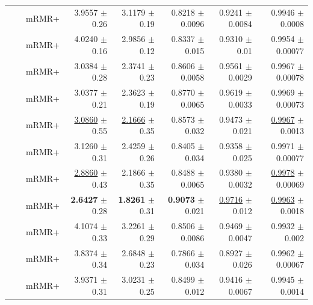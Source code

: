\begin{longtable}{llp{}rrrrr}
 &  & mRMR+ & 3.9557 {\scriptsize $\pm$ 0.26} & 3.1179 {\scriptsize $\pm$ 0.19} & 0.8218 {\scriptsize $\pm$ 0.0096} & 0.9241 {\scriptsize $\pm$ 0.0084} & 0.9946 {\scriptsize $\pm$ 0.0008} \\
 &  & mRMR+ & 4.0240 {\scriptsize $\pm$ 0.16} & 2.9856 {\scriptsize $\pm$ 0.12} & 0.8337 {\scriptsize $\pm$ 0.015} & 0.9310 {\scriptsize $\pm$ 0.01} & 0.9954 {\scriptsize $\pm$ 0.00077} \\
 &  & mRMR+ & 3.0384 {\scriptsize $\pm$ 0.28} & 2.3741 {\scriptsize $\pm$ 0.23} & 0.8606 {\scriptsize $\pm$ 0.0058} & 0.9561 {\scriptsize $\pm$ 0.0029} & 0.9967 {\scriptsize $\pm$ 0.00078} \\
 &  & mRMR+ & 3.0377 {\scriptsize $\pm$ 0.21} & 2.3623 {\scriptsize $\pm$ 0.19} & 0.8770 {\scriptsize $\pm$ 0.0065} & 0.9619 {\scriptsize $\pm$ 0.0033} & 0.9969 {\scriptsize $\pm$ 0.00073} \\
 &  & mRMR+ & \underline{3.0860} {\scriptsize $\pm$ 0.55} & \underline{2.1666} {\scriptsize $\pm$ 0.35} & 0.8573 {\scriptsize $\pm$ 0.032} & 0.9473 {\scriptsize $\pm$ 0.021} & \underline{0.9967} {\scriptsize $\pm$ 0.0013} \\
 &  & mRMR+ & 3.1260 {\scriptsize $\pm$ 0.31} & 2.4259 {\scriptsize $\pm$ 0.26} & 0.8405 {\scriptsize $\pm$ 0.034} & 0.9358 {\scriptsize $\pm$ 0.025} & 0.9971 {\scriptsize $\pm$ 0.00077} \\
 &  & mRMR+ & \underline{2.8860} {\scriptsize $\pm$ 0.43} & 2.1866 {\scriptsize $\pm$ 0.35} & 0.8488 {\scriptsize $\pm$ 0.0065} & 0.9380 {\scriptsize $\pm$ 0.0032} & \underline{0.9978} {\scriptsize $\pm$ 0.00069} \\
 &  & mRMR+ & \textbf{2.6427} {\scriptsize $\pm$ 0.28} & \textbf{1.8261} {\scriptsize $\pm$ 0.31} & \textbf{0.9073} {\scriptsize $\pm$ 0.021} & \underline{0.9716} {\scriptsize $\pm$ 0.012} & \underline{0.9963} {\scriptsize $\pm$ 0.0018} \\
 &  & mRMR+ & 4.1074 {\scriptsize $\pm$ 0.33} & 3.2261 {\scriptsize $\pm$ 0.29} & 0.8506 {\scriptsize $\pm$ 0.0086} & 0.9469 {\scriptsize $\pm$ 0.0047} & 0.9932 {\scriptsize $\pm$ 0.002} \\
 &  & mRMR+ & 3.8374 {\scriptsize $\pm$ 0.34} & 2.6848 {\scriptsize $\pm$ 0.23} & 0.7866 {\scriptsize $\pm$ 0.034} & 0.8927 {\scriptsize $\pm$ 0.026} & 0.9962 {\scriptsize $\pm$ 0.00067} \\
 &  & mRMR+ & 3.9371 {\scriptsize $\pm$ 0.31} & 3.0231 {\scriptsize $\pm$ 0.25} & 0.8499 {\scriptsize $\pm$ 0.012} & 0.9416 {\scriptsize $\pm$ 0.0067} & 0.9945 {\scriptsize $\pm$ 0.0014} \\

\end{longtable}
